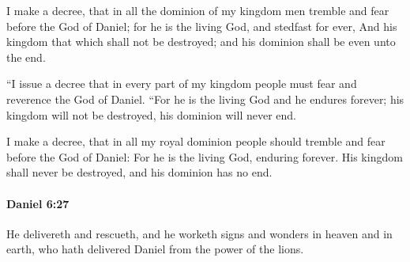 			\begin{versebox}
					\item[BHS] 
					\item[LXX] 
					\item[ASV] I make a decree, that in all the dominion of my kingdom men tremble and fear before the God of Daniel; for he is the living God, and stedfast for ever, And his kingdom that which shall not be destroyed; and his dominion shall be even unto the end.
					\item[NIV] “I issue a decree that in every part of my kingdom people must fear and reverence the God of Daniel. “For he is the living God and he endures forever; his kingdom will not be destroyed, his dominion will never end.
					\item[NRSV] I make a decree, that in all my royal dominion people should tremble and fear before the God of Daniel: For he is the living God, enduring forever. His kingdom shall never be destroyed, and his dominion has no end.
			\end{versebox}

		\paragraph{Daniel 6:27} %
			\label{DANIEL-6-27}

			He delivereth and rescueth, and he worketh signs and wonders in heaven and in earth, who hath delivered Daniel from the power of the lions.

